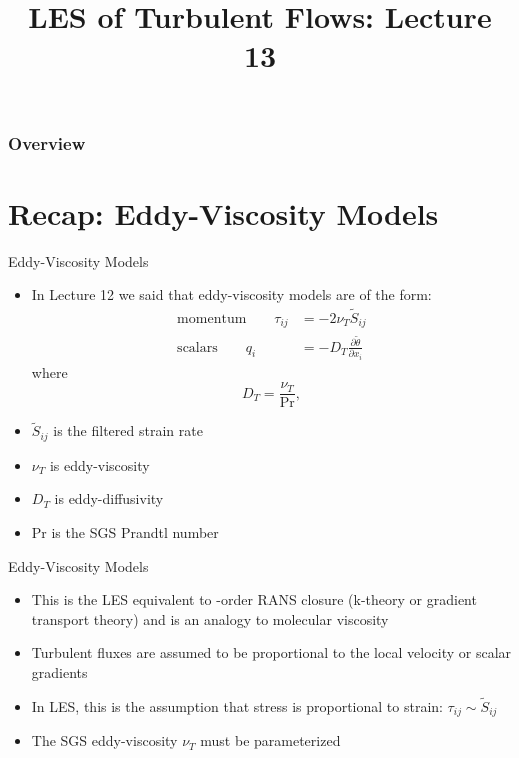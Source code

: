 
\title{LES of Turbulent Flows: Lecture 13}




\begin{frame} 
  \titlepage
\end{frame}


\begin{frame}
\frametitle{Overview}
\tableofcontents
\end{frame}

\section{Recap: Eddy-Viscosity Models} %
\begin{frame}{Eddy-Viscosity Models}
\begin{itemize}
	\item In Lecture 12 we said that eddy-viscosity models are of the form:
	\begin{align*}
		\text{momentum} \qquad \tau_{ij} &= -2\nu_{T} \widetilde{S}_{ij}\\
		\text{scalars} \qquad q_i &= -D_T \frac{\partial \widetilde{\theta}}{\partial x_i}
	\end{align*}
	where
	$$D_T = \frac{\nu_T}{\text{Pr}},$$
	\item $\widetilde{S}_{ij}$ is the filtered strain rate
	\item $\nu_T$ is eddy-viscosity
	\item $D_T$ is eddy-diffusivity
	\item Pr is the SGS Prandtl number 
\end{itemize}

\end{frame}

\begin{frame}{Eddy-Viscosity Models}
\begin{itemize}
	\item This is the LES equivalent to -order RANS closure (k-theory or gradient transport theory) and is an analogy to molecular viscosity
	\item Turbulent fluxes are assumed to be proportional to the local velocity or scalar gradients
	\item In LES, this is the assumption that stress is proportional to strain: $\tau_{ij} \sim \widetilde{S}_{ij}$
	\item The SGS eddy-viscosity $\nu_T$ must be parameterized   
\end{itemize}

\end{frame}

